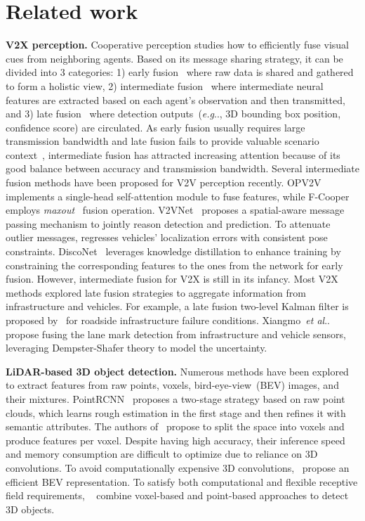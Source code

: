 \documentclass[runningheads]{llncs}
\makeatletter
\DeclareRobustCommand\onedot{\futurelet\@let@token\@onedot}
\def\@onedot{\ifx\@let@token.\else.\null\fi\xspace}
\def\eg{\emph{e.g}\onedot} \def\Eg{\emph{E.g}\onedot}
\def\etal{\emph{et al}\onedot}
\makeatother
\begin{document}
\section{Related work}
\label{sec:related}
\noindent\textbf{V2X perception.} Cooperative perception studies how to efficiently fuse visual cues from neighboring agents. Based on its message sharing strategy, it can be divided into 3 categories: 1) early fusion~\cite{chen2019cooper} where raw data is shared and gathered to form a holistic view, 2) intermediate fusion~\cite{wang2020v2vnet,xu2021opv2v,vadivelu2020learning,chen2019f} where intermediate neural features are extracted based on each agent's observation and then transmitted, and 3) late fusion~\cite{rauch2012car2x,rawashdeh2018collaborative} where detection outputs~(\eg, 3D bounding box position, confidence score) are circulated. As early fusion usually requires large transmission bandwidth and late fusion fails to provide valuable scenario context~\cite{wang2020v2vnet},  intermediate fusion has attracted increasing attention because of its good balance between accuracy and transmission bandwidth. Several intermediate fusion methods have been proposed for V2V perception recently. OPV2V~\cite{xu2021opv2v} implements a single-head self-attention module to fuse features, while F-Cooper employs \textit{maxout}~\cite{goodfellow2013maxout} fusion operation. V2VNet~\cite{wang2020v2vnet} proposes a spatial-aware message passing mechanism to jointly reason detection and prediction. To attenuate outlier messages, \cite{vadivelu2020learning} regresses vehicles' localization errors with consistent pose constraints. DiscoNet~\cite{li2021learning} leverages knowledge distillation to enhance training by constraining the corresponding features to the ones from the network for early fusion. However, intermediate fusion for V2X is still in its infancy. Most V2X methods explored late fusion strategies to aggregate information from infrastructure and vehicles. For example, a late fusion two-level Kalman filter is proposed by~\cite{mo2021method} for roadside infrastructure failure conditions. Xiangmo~\etal~\cite{zhao2017cooperative} propose fusing the lane mark detection from infrastructure and vehicle sensors, leveraging Dempster-Shafer theory to model the uncertainty. 

\noindent\textbf{LiDAR-based 3D object detection.} Numerous methods have been explored to extract features from raw points, voxels, bird-eye-view~(BEV) images, and their mixtures. PointRCNN~\cite{shi2019pointrcnn} proposes a two-stage strategy based on raw point clouds, which learns rough estimation in the first stage and then refines it with semantic attributes. The authors of~\cite{zhou2018voxelnet,yan2018second} propose to split the space into voxels and produce features per voxel. Despite having high accuracy, their inference speed and memory consumption are difficult to optimize due to reliance on 3D convolutions. To avoid computationally expensive 3D convolutions,~\cite{lang2019pointpillars,yang2018pixor} propose an efficient BEV representation. To satisfy both computational and flexible receptive field requirements, ~\cite{shi2020pv,zhong2021vin,yang2019std} combine voxel-based and point-based approaches to detect 3D objects. 
\end{document}
